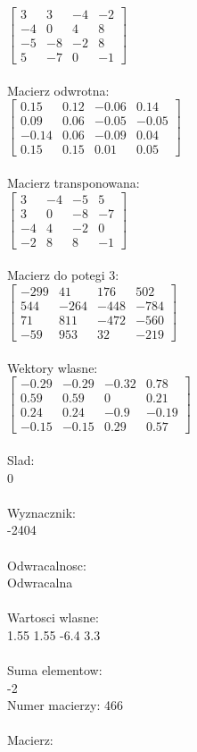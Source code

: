 \documentclass[a4paper,12pt]{article}
\begin{document}
$\begin{bmatrix} 3&3&-4&-2\\-4&0&4&8\\-5&-8&-2&8\\5&-7&0&-1 \end{bmatrix}$
\\
\\
Macierz odwrotna:\\

$\begin{bmatrix} 0.15&0.12&-0.06&0.14\\0.09&0.06&-0.05&-0.05\\-0.14&0.06&-0.09&0.04\\0.15&0.15&0.01&0.05 \end{bmatrix}$
\\
\\
Macierz transponowana:\\

$\begin{bmatrix} 3&-4&-5&5\\3&0&-8&-7\\-4&4&-2&0\\-2&8&8&-1 \end{bmatrix}$
\\
\\
Macierz do potegi 3:\\

$\begin{bmatrix} -299&41&176&502\\544&-264&-448&-784\\71&811&-472&-560\\-59&953&32&-219 \end{bmatrix}$
\\
\\
Wektory wlasne:\\

$\begin{bmatrix} -0.29&-0.29&-0.32&0.78\\0.59&0.59&0&0.21\\0.24&0.24&-0.9&-0.19\\-0.15&-0.15&0.29&0.57 \end{bmatrix}$
\\
\\
Slad:\\
0
\\
\\
Wyznacznik:\\
-2404
\\
\\
Odwracalnosc:\\
Odwracalna
\\
\\
Wartosci wlasne:\\
1.55 1.55 -6.4 3.3
\\
\\
Suma elementow:\\
-2
\\
\newpage
Numer macierzy:
466
\\
\\
Macierz:\\
\end{document}
